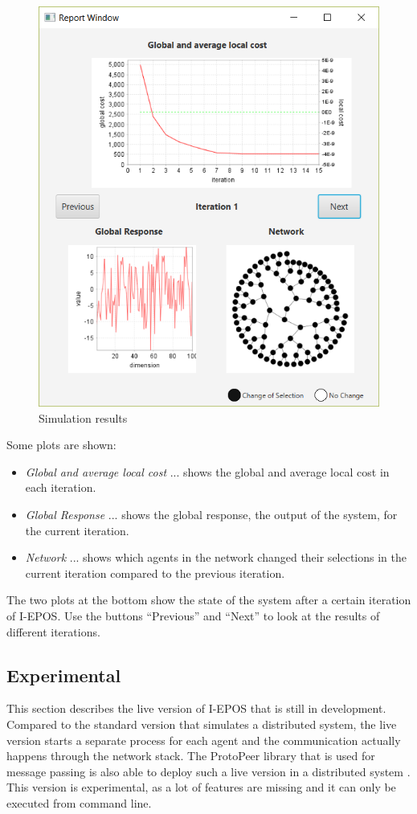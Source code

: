 \documentclass[11pt]{article} %
\begin{document}
\begin{itemize}
\begin{figure}[h]
\includegraphics[scale=0.6]{img/results.png}
\caption{Simulation results}
\label{fig:result}
\end{figure}
\end{itemize}
Some plots are shown:
	\begin{itemize}
		\item \emph{Global and average local cost} ... shows the global and average local cost in each iteration.
		\item \emph{Global Response} ... shows the global response, the output of the system, for the current iteration.
		\item \emph{Network} ...  shows which agents in the network changed their selections in the current iteration compared to the previous iteration.
	\end{itemize}
	The two plots at the bottom show the state of the system after a certain iteration of I-EPOS.  Use the buttons ``Previous'' and ``Next'' to look at the results of different iterations.

\subsection{Experimental}
This section describes the live version of I-EPOS that is still in development.
Compared to the standard version that simulates a
distributed system, the live version starts a separate process for each agent and the communication
actually happens through the network stack.
The ProtoPeer library that is used for message passing is also able to deploy such a live version in
a distributed system \cite{protopeer}.
This version is experimental, as a lot of features are missing and it can only be executed from command line.
\end{document}
